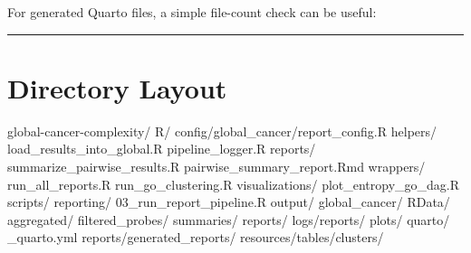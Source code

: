 \documentclass[
  letterpaper,
  DIV=11,
  numbers=noendperiod,
  openany,
  oneside]{scrreprt}
\newenvironment{Shaded}{\begin{snugshade}}{\end{snugshade}}
\newcommand{\AttributeTok}[1]{\textcolor[rgb]{0.40,0.45,0.13}{#1}}
\newcommand{\ConstantTok}[1]{\textcolor[rgb]{0.56,0.35,0.01}{#1}}
\newcommand{\FunctionTok}[1]{\textcolor[rgb]{0.28,0.35,0.67}{#1}}
\newcommand{\NormalTok}[1]{\textcolor[rgb]{0.00,0.23,0.31}{#1}}
\newcommand{\OtherTok}[1]{\textcolor[rgb]{0.00,0.23,0.31}{#1}}
\newcommand{\SpecialCharTok}[1]{\textcolor[rgb]{0.37,0.37,0.37}{#1}}
\newcommand{\StringTok}[1]{\textcolor[rgb]{0.13,0.47,0.30}{#1}}
\begin{document}
For generated Quarto files, a simple file-count check can be useful:

\begin{Shaded}
\end{Shaded}

\begin{center}\rule{0.5\linewidth}{0.5pt}\end{center}

\section*{Directory Layout}\label{directory-layout-2}


\begin{Shaded}
\begin{Highlighting}[]
\NormalTok{global{-}cancer{-}complexity/}
\NormalTok{  R/}
\NormalTok{    config/global\_cancer/report\_config.R}
\NormalTok{    helpers/}
\NormalTok{      load\_results\_into\_global.R}
\NormalTok{      pipeline\_logger.R}
\NormalTok{    reports/}
\NormalTok{      summarize\_pairwise\_results.R}
\NormalTok{      pairwise\_summary\_report.Rmd}
\NormalTok{    wrappers/}
\NormalTok{      run\_all\_reports.R}
\NormalTok{      run\_go\_clustering.R}
\NormalTok{    visualizations/}
\NormalTok{      plot\_entropy\_go\_dag.R}
\NormalTok{  scripts/}
\NormalTok{    reporting/}
\NormalTok{      03\_run\_report\_pipeline.R}
\NormalTok{  output/}
\NormalTok{    global\_cancer/}
\NormalTok{      RData/}
\NormalTok{        aggregated/}
\NormalTok{        filtered\_probes/}
\NormalTok{        summaries/}
\NormalTok{      reports/}
\NormalTok{      logs/reports/}
\NormalTok{      plots/}
\NormalTok{  quarto/}
\NormalTok{    \_quarto.yml}
\NormalTok{    reports/generated\_reports/}
\NormalTok{    resources/tables/clusters/}
\end{Highlighting}
\end{Shaded}
\end{document}
